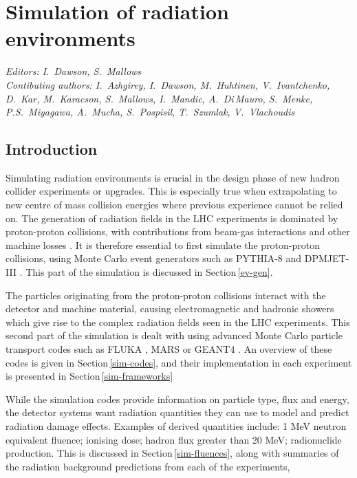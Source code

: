 \section{Simulation of radiation environments}
\label{sec:simulation}

{\it Editors: I.~Dawson, S.~Mallows}  \\
{\it Contibuting authors: I.~Azhgirey, I.~Dawson, M.~Huhtinen, V.~Ivantchenko, D.~Kar, M.~Karacson, S.~Mallows, I.~Mandic, A.~Di\,Mauro, S.~Menke, P.S.~Miyagawa, A.~Mucha, S.~Pospisil, T.~Szumlak, V.~Vlachoudis}  

\subsection{Introduction}
Simulating radiation environments  is crucial in the design phase of new hadron collider experiments or upgrades. 
This is especially true when extrapolating to new centre of mass collision energies where previous experience cannot be relied on. 
The generation of radiation fields in the LHC experiments is dominated by proton-proton collisions, with contributions from beam-gas interactions and other machine losses \cite{beam_bg}. 
It is therefore essential to first simulate the proton-proton collisions, using Monte Carlo event generators such as PYTHIA-8 \cite{PYTHIA} and DPMJET-III  \cite{DPMJET}. This part of the simulation is discussed in Section\,\ref{ev-gen}. 

The particles originating from the proton-proton collisions interact with the detector and machine material, causing electromagnetic and hadronic showers which give rise to the complex radiation fields seen in the LHC experiments. This second part of the simulation is dealt with using advanced Monte Carlo particle transport codes such as FLUKA  \cite{FLUKA}, MARS  \cite{MARS} or GEANT4  \cite{GEANT4}. An overview of these codes is given in Section\,\ref{sim-codes}, and their implementation in each experiment is presented in Section\,\ref{sim-frameworks}

While the simulation codes provide information on particle type, flux and energy, the detector systems want radiation quantities they can use to model and predict radiation damage effects. Examples of derived quantities include: 1 MeV neutron equivalent fluence; ionising dose; hadron flux greater than 20 MeV; radionuclide production.  This is discussed in Section\,\ref{sim-fluences}, along with summaries of the radiation background predictions from each of the experiments, 

